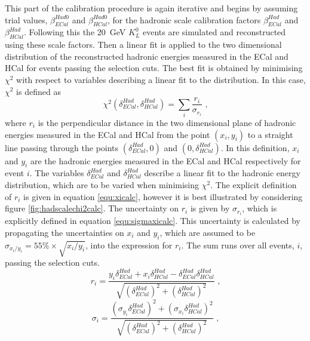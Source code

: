 This part of the calibration procedure is again iterative and begins by assuming trial values, $\beta^{Had0}_{ECal}$ and $\beta^{Had0}_{HCal}$, for the hadronic scale calibration factors $\beta^{Had}_{ECal}$ and $\beta^{Had}_{HCal}$.  Following this the 20~GeV $K^{0}_{L}$ events are simulated and reconstructed using these scale factors.  Then a linear fit is applied to the two dimensional distribution of the reconstructed hadronic energies measured in the ECal and HCal for events passing the selection cuts.  The best fit is obtained by minimising $\chi^{2}$ with respect to variables describing a linear fit to the distribution.  In this case, $\chi^{2}$ is defined as
%
\begin{equation}
\chi^{2}(\delta^{Had}_{ECal}, \delta^{Had}_{HCal}) = \sum_{i} \frac{r_{i}}{\sigma_{r_{i}}}\text{ ,}
\end{equation}
%
\noindent where $r_{i}$ is the perpendicular distance in the two dimensional plane of hadronic energies measured in the ECal and HCal from the point $(x_{i}, y_{i})$ to a straight line passing through the points $(\delta^{Had}_{ECal}, 0)$ and $(0, \delta^{Had}_{HCal})$.  In this definition, $x_{i}$ and $y_{i}$ are the hadronic energies measured in the ECal and HCal respectively for event $i$.  The variables $\delta^{Had}_{ECal}$ and $\delta^{Had}_{HCal}$ describe a linear fit to the hadronic energy distribution, which are to be varied when minimising $\chi^{2}$.  The explicit definition of $r_{i}$ is given in equation \ref{equ:xicalc}, however it is best illustrated by considering figure \ref{fig:hadscalechi2calc}.  The uncertainty on $r_{i}$ is given by $\sigma_{r_{i}}$, which is explicitly defined in equation \ref{equ:sigmaxicalc}.  This uncertainty is calculated by propagating the uncertainties on $x_{i}$ and $y_{i}$, which are assumed to be $\sigma_{x_{i}/y_{i}} = 55\% \times \sqrt{x_{i}/y_{i}}$, into the expression for $r_{i}$.  The sum runs over all events, $i$, passing the selection cuts.  
%
\begin{equation}
r_{i} = \frac{y_{i} \delta^{Had}_{ECal} + x_{i} \delta^{Had}_{HCal} - \delta^{Had}_{ECal} \delta^{Had}_{HCal}}{\sqrt{(\delta^{Had}_{ECal})^{2} + (\delta^{Had}_{HCal})^{2}}}\text{ ,}
\label{equ:xicalc}
\end{equation}
\begin{equation}
\sigma_{i} = \frac{(\sigma_{y_{i}}  \delta^{Had}_{ECal})^{2} + (\sigma_{x_{i}} \delta^{Had}_{HCal})^{2}}{\sqrt{(\delta^{Had}_{ECal})^{2} + (\delta^{Had}_{HCal})^{2}}}\text{ ,}
\label{equ:sigmaxicalc}
\end{equation}
